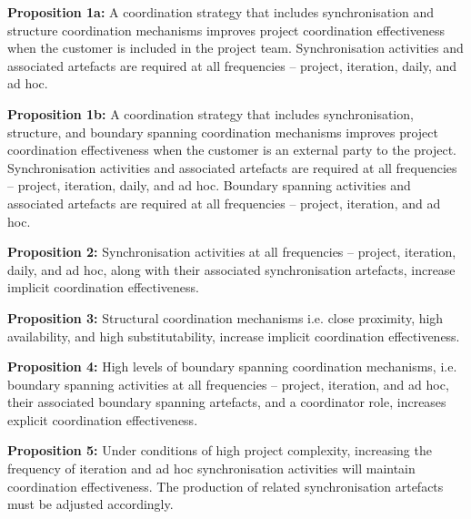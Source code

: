 \begin{fancyquotes}
\textbf{Proposition 1a:} A coordination strategy that includes synchronisation and structure coordination mechanisms improves project coordination effectiveness when the customer is included in the project team. Synchronisation activities and associated artefacts are required at all frequencies – project, iteration, daily, and ad hoc.
\end{fancyquotes}

\begin{fancyquotes}
\textbf{Proposition 1b:} A coordination strategy that includes synchronisation, structure, and boundary spanning coordination mechanisms improves project coordination effectiveness when the customer is an external party to the project. Synchronisation activities and associated artefacts are required at all frequencies – project, iteration, daily, and ad hoc. Boundary spanning activities and associated artefacts are required at all frequencies – project, iteration, and ad hoc.
\end{fancyquotes}

\begin{fancyquotes}
\textbf{Proposition 2:} Synchronisation activities at all frequencies – project, iteration, daily, and ad hoc, along with their associated synchronisation artefacts, increase implicit coordination effectiveness.
\end{fancyquotes}

\begin{fancyquotes}
\textbf{Proposition 3:} Structural coordination mechanisms i.e. close proximity, high availability, and high substitutability, increase implicit coordination effectiveness.
\end{fancyquotes}

\begin{fancyquotes}
\textbf{Proposition 4:} High levels of boundary spanning coordination mechanisms, i.e. boundary spanning activities at all frequencies – project, iteration, and ad hoc, their associated boundary spanning artefacts, and a coordinator role, increases explicit coordination effectiveness.
\end{fancyquotes}

\begin{fancyquotes}
\textbf{Proposition 5:} Under conditions of high project complexity, increasing the frequency of iteration and ad hoc synchronisation activities will maintain coordination effectiveness. The production of related synchronisation artefacts must be adjusted accordingly.
\end{fancyquotes}

